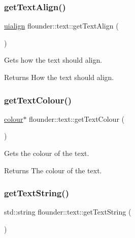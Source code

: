 \subsubsection{\texorpdfstring{get\+Text\+Align()}{getTextAlign()}}
{\footnotesize\ttfamily \hyperlink{namespaceflounder_a70f1871d5c05aa8e078dd37501ce10a9}{uialign} flounder\+::text\+::get\+Text\+Align (\begin{DoxyParamCaption}{ }\end{DoxyParamCaption})\hspace{0.3cm}{\ttfamily [inline]}}



Gets how the text should align. 

\begin{DoxyReturn}{Returns}
How the text should align. 
\end{DoxyReturn}
\mbox{\label{classflounder_1_1text_a583497e298f908f71d7d3982999eccbb}} 
\subsubsection{\texorpdfstring{get\+Text\+Colour()}{getTextColour()}}
{\footnotesize\ttfamily \hyperlink{classflounder_1_1colour}{colour}$\ast$ flounder\+::text\+::get\+Text\+Colour (\begin{DoxyParamCaption}{ }\end{DoxyParamCaption})\hspace{0.3cm}{\ttfamily [inline]}}



Gets the colour of the text. 

\begin{DoxyReturn}{Returns}
The colour of the text. 
\end{DoxyReturn}
\mbox{\label{classflounder_1_1text_a6eb2c9461c6fb9fd78bd97d56846f562}} 
\subsubsection{\texorpdfstring{get\+Text\+String()}{getTextString()}}
{\footnotesize\ttfamily std\+::string flounder\+::text\+::get\+Text\+String (\begin{DoxyParamCaption}{ }\end{DoxyParamCaption})\hspace{0.3cm}{\ttfamily [inline]}}



